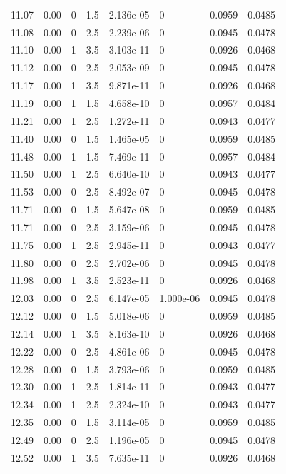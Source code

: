 \documentclass[preview]{standalone}
\begin{document}
{{{{{\begin{tabular}{L{1.2cm}C{1.2cm} C{0.3cm}C{0.5cm} C{1.4cm}C{1.4cm} C{1.4cm}C{1.4cm}}
  11.07  &  0.00  & 0     & 1.5 &  2.136e-05  & 0  & 0.0959 &  0.0485   \\ 
  11.08  &  0.00  & 0     & 2.5 &  2.239e-06  & 0  & 0.0945 &  0.0478   \\ 
  11.10  &  0.00  & 1     & 3.5 &  3.103e-11  & 0  & 0.0926 &  0.0468   \\ 
  11.12  &  0.00  & 0     & 2.5 &  2.053e-09  & 0  & 0.0945 &  0.0478   \\ 
  11.17  &  0.00  & 1     & 3.5 &  9.871e-11  & 0  & 0.0926 &  0.0468   \\ 
  11.19  &  0.00  & 1     & 1.5 &  4.658e-10  & 0  & 0.0957 &  0.0484   \\ 
  11.21  &  0.00  & 1     & 2.5 &  1.272e-11  & 0  & 0.0943 &  0.0477   \\ 
  11.40  &  0.00  & 0     & 1.5 &  1.465e-05  & 0  & 0.0959 &  0.0485   \\ 
  11.48  &  0.00  & 1     & 1.5 &  7.469e-11  & 0  & 0.0957 &  0.0484   \\ 
  11.50  &  0.00  & 1     & 2.5 &  6.640e-10  & 0  & 0.0943 &  0.0477   \\ 
  11.53  &  0.00  & 0     & 2.5 &  8.492e-07  & 0  & 0.0945 &  0.0478   \\ 
  11.71  &  0.00  & 0     & 1.5 &  5.647e-08  & 0  & 0.0959 &  0.0485   \\ 
  11.71  &  0.00  & 0     & 2.5 &  3.159e-06  & 0  & 0.0945 &  0.0478   \\ 
  11.75  &  0.00  & 1     & 2.5 &  2.945e-11  & 0  & 0.0943 &  0.0477   \\ 
  11.80  &  0.00  & 0     & 2.5 &  2.702e-06  & 0  & 0.0945 &  0.0478   \\ 
  11.98  &  0.00  & 1     & 3.5 &  2.523e-11  & 0  & 0.0926 &  0.0468   \\ 
  12.03  &  0.00  & 0     & 2.5 &  6.147e-05  & 1.000e-06  & 0.0945 &  0.0478   \\ 
  12.12  &  0.00  & 0     & 1.5 &  5.018e-06  & 0  & 0.0959 &  0.0485   \\ 
  12.14  &  0.00  & 1     & 3.5 &  8.163e-10  & 0  & 0.0926 &  0.0468   \\ 
  12.22  &  0.00  & 0     & 2.5 &  4.861e-06  & 0  & 0.0945 &  0.0478   \\ 
  12.28  &  0.00  & 0     & 1.5 &  3.793e-06  & 0  & 0.0959 &  0.0485   \\ 
  12.30  &  0.00  & 1     & 2.5 &  1.814e-11  & 0  & 0.0943 &  0.0477   \\ 
  12.34  &  0.00  & 1     & 2.5 &  2.324e-10  & 0  & 0.0943 &  0.0477   \\ 
  12.35  &  0.00  & 0     & 1.5 &  3.114e-05  & 0  & 0.0959 &  0.0485   \\ 
  12.49  &  0.00  & 0     & 2.5 &  1.196e-05  & 0  & 0.0945 &  0.0478   \\ 
  12.52  &  0.00  & 1     & 3.5 &  7.635e-11  & 0  & 0.0926 &  0.0468   \\ 
\hline 
\end{tabular} 

}}}}}
\end{document}
